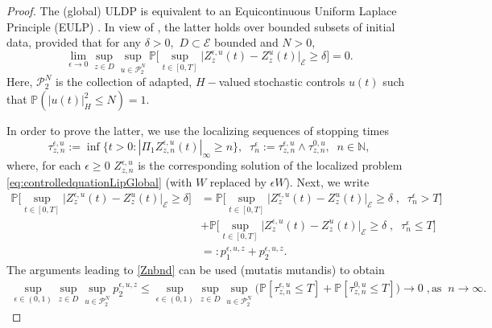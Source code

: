\documentclass[10pt, reqno]{amsart}
\newcommand{\N}{\mathbb{N}}
\newcommand{\pr}{\mathbb{P}}
\newcommand{\e}{\mathcal{E}}
\theoremstyle{definition}
\numberwithin{lem}{section}
\numberwithin{cor}{section}
\numberwithin{prop}{section}
\numberwithin{thm}{section}
\numberwithin{dfn}{section}
\begin{document}
              \begin{proof}    
     The (global) ULDP is equivalent to an Equicontinuous Uniform Laplace Principle (EULP) \cite[Theorem 2.9]{salins2019equivalences}. In view of  \cite[Theorem 2.12]{salins2019equivalences}, the latter holds over bounded subsets of initial data, provided that for any $\delta>0,$ $D\subset\e$ bounded and $N>0,$
    	   \begin{equation}
    	       \label{eq:EULPsufficientGlobal}
            \lim_{\epsilon\to 0}\sup_{z\in D}\sup_{u\in\mathcal{P}_2^N}\pr\bigg[\sup_{t\in[0,T]}\big|Z_z^{\epsilon,u}(t)-Z_z^{u}(t)\big|_{\e}\geq \delta \bigg]=0.
    	   \end{equation}
        Here, $\mathcal{P}_2^N$ is the collection of adapted, $H-$valued stochastic controls $u(t)$ such that $\pr( |u(t)|^2_H\leq N)=1.  $
       
    	   In order to prove the latter, we use the localizing sequences of stopping times $$\tau^{\epsilon,u}_{z,n}:=\inf\{t>0 : |\Pi_1 Z^{\epsilon,u}_{z,n}(t)|_{\infty}\geq n\},\;\;\tau^\epsilon_n:=\tau^{\epsilon,u}_{z,n}\wedge \tau^{0,u}_{z,n},\;\;n\in\N,$$
        where, for each $\epsilon\geq 0$ $Z^{\epsilon,u}_{z,n}$ is the corresponding solution of the localized problem \eqref{eq:controlledquationLipGlobal} (with $W$ replaced by $\epsilon W$). Next, we write
    	   \begin{equation*}\label{eq:p1p2DecompULDP}
    	   \begin{aligned}
    	      \pr\bigg[  \sup_{t\in[0,T]}
           \big|Z_z^{\epsilon,u}(t)-Z_z^{u}(t)\big|_{\e}\geq \delta   \bigg]&=\pr\bigg[  \sup_{t\in[0,T]}\big|Z_z^{\epsilon,u}(t)-Z_z^{u}(t)\big|_{\e}\geq \delta\;,\;\; \tau^{\epsilon}_{n}>T\bigg]\\&+\pr\bigg[  \sup_{t\in[0,T]}\big|Z_{z}^{\epsilon,u}(t)-Z_z^{u}(t)\big|_{\e}\geq \delta\;,\;\; \tau^{\epsilon}_{n}\leq T\bigg]\\&=:p^{\epsilon,u,z}_1+p^{\epsilon,u,z}_2.
    	   \end{aligned}
    	   \end{equation*}
    	  The arguments leading to \eqref{Znbnd} can be used (mutatis mutandis) to obtain
    	    \begin{equation}\label{p2bnd}
    	   \begin{aligned}
    	   \sup_{\epsilon\in(0,1)}\sup_{z\in D}\sup_{u\in\mathcal{P}_2^N}p^{\epsilon,u,z}_2\leq \sup_{\epsilon\in(0,1)}\sup_{z\in D}\sup_{u\in\mathcal{P}_2^N}\bigg(\pr[\tau^{\epsilon,u}_{z,n}\leq T]+\pr[\tau^{0,u}_{z,n}\leq T]\bigg)\longrightarrow 0\;,\text{as}\;\;n\to\infty.
    	   \end{aligned}
    	   \end{equation}
        

\end{proof}
\end{document}
